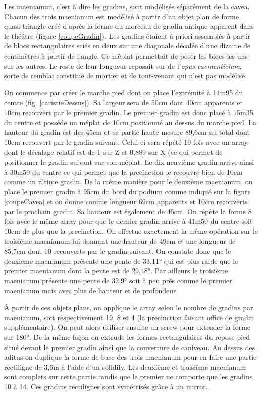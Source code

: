 Les maenianum, c'est à dire les gradins, sont modélisés séparément de la cavea. Chacun des trois maenianum est modélisé à partir d'un objet plan de forme quasi-triangle créé d'après la forme du morceau de gradin antique apparent dans le théâtre (figure \ref{coupeGradin}). Les gradins étaient à priori assemblés à partir de blocs rectangulaires sciés en deux sur une diagonale décalée d'une dizaine de centimètres à partir de l'angle. Ce méplat permettait de poser les blocs les uns sur les autres. Le reste de leur longueur reposait sur de l'\textit{opus caementicium}, sorte de remblai constitué de mortier et de tout-venant qui n'est pas modélisé. 

On commence par créer le marche pied dont on place l'extrémité à 14m95 du centre (fig. \ref{caristieDessus}). Sa largeur sera de 50cm dont 40cm apparents et 10cm recouvert par le premier gradin. Le premier gradin est donc placé à 15m35 du centre et possède un méplat de 10cm positionné au dessus du marche pied. La hauteur du gradin est des 45cm et sa partie haute mesure 89,6cm au total dont 10cm recouvert par le gradin suivant. Celui-ci sera répété 19 fois avec un \gls{array} dont le décalage relatif est de 1 sur Z et 0,889 sur X (ce qui permet de positionner le gradin suivant sur son méplat. Le dix-neuvième gradin arrive ainsi à 30m59 du centre ce qui permet que la precinction le recouvre bien de 10cm comme un ultime gradin. De la même manière pour le deuxième maenianum, on place le premier gradin à 95cm du bord du podium comme indiqué sur la figure \ref{coupeCavea} et on donne comme longueur 69cm apparents et 10cm recouverts par le prochain gradin. Sa hauteur est également de 45cm. On répète la forme 8 fois avec le même \gls{array} pour que le dernier gradin arrive à 41m50 du centre soit 10cm de plus que la precinction. On effectue exactement la même opération sur le troisième maenianum lui donnant une hauteur de 49cm et une longueur de 85,7cm dont 10 recouverts par le gradin suivant. On constate donc que le deuxième maenianum présente une pente de 33,11° qui est plus raide que le premier maenianum dont la pente est de 29,48°. Par ailleurs le troisième maenianum présente une pente de 32,9° soit à peu près comme le premier maenianum mais avec plus de hauteur et de profondeur.

\`{A} partir de ces objets plans, on applique le \gls{array} selon le nombre de gradins par maenianum, soit respectivement 19, 8 et 4 (la precinction faisant office de gradin supplémentaire). On peut alors utiliser ensuite un \gls{screw} pour extruder la forme sur 180°. De la même façon on extrude les formes rectangulaires du repose pied situé devant le premier gradin ainsi que la couverture de caniveau. Au dessus des aditus on duplique la forme de base des trois maenianum pour en faire une partie rectiligne de 3,6m à l'aide d'un \gls{solidify}. Les deuxième et troisième maenianum sont complets sur cette partie tandis que le premier ne comporte que les gradins 10 à 14. Ces gradins rectilignes sont symétrisés grâce à un \gls{mirror}.

